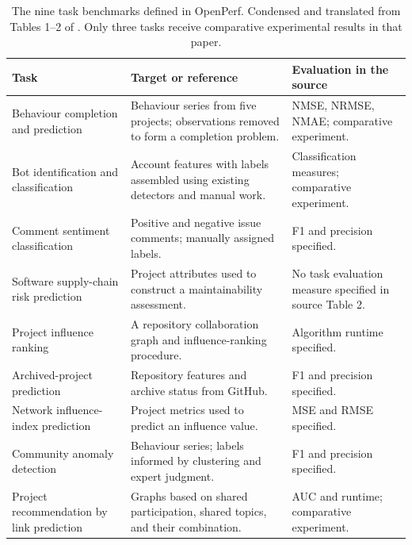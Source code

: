 \begin{table}[htbp]
\caption{The nine task benchmarks defined in OpenPerf. Condensed and translated from Tables 1--2 of \citet{han2025openperf}. Only three tasks receive comparative experimental results in that paper.}
\label{tab:ch11-tasks}
\centering\small\renewcommand{\arraystretch}{1.17}
\begin{tabularx}{\linewidth}{@{}>{\raggedright\arraybackslash}p{.33\linewidth}>{\raggedright\arraybackslash}X>{\raggedright\arraybackslash}X@{}}
\toprule
\textbf{Task} & \textbf{Target or reference} & \textbf{Evaluation in the source}\\\midrule
Behaviour completion and prediction & Behaviour series from five projects; observations removed to form a completion problem. & NMSE, NRMSE, NMAE; comparative experiment.\\[5pt]
Bot identification and classification & Account features with labels assembled using existing detectors and manual work. & Classification measures; comparative experiment.\\[5pt]
Comment sentiment classification & Positive and negative issue comments; manually assigned labels. & F1 and precision specified.\\[5pt]
Software supply-chain risk prediction & Project attributes used to construct a maintainability assessment. & No task evaluation measure specified in source Table 2.\\[5pt]
Project influence ranking & A repository collaboration graph and influence-ranking procedure. & Algorithm runtime specified.\\[5pt]
Archived-project prediction & Repository features and archive status from GitHub. & F1 and precision specified.\\[5pt]
Network influence-index prediction & Project metrics used to predict an influence value. & MSE and RMSE specified.\\[5pt]
Community anomaly detection & Behaviour series; labels informed by clustering and expert judgment. & F1 and precision specified.\\[5pt]
Project recommendation by link prediction & Graphs based on shared participation, shared topics, and their combination. & AUC and runtime; comparative experiment.\\
\bottomrule
\end{tabularx}
\end{table}
